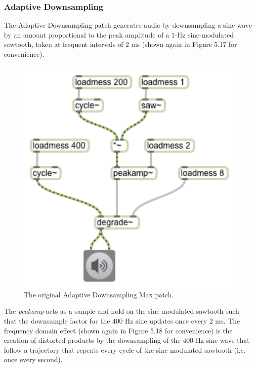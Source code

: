 \documentclass[a4paper,12pt]{report} 	%
\numberwithin{figure}{chapter}
\numberwithin{table}{chapter}
\numberwithin{equation}{chapter}
\begin{document}
\begin{flushleft}
\clearpage
\subsubsection{Adaptive Downsampling}
The Adaptive Downsampling patch generates audio by downsampling a sine wave by an amount proportional to the peak amplitude of a $1$-Hz sine-modulated sawtooth, taken at frequent intervals of $2$ ms (shown again in Figure 5.17 for convenience).
\begin{figure}[h!]
\begin{center}
\includegraphics[scale=0.8]{AdaptiveDegrade}
\caption[Original Adaptive Downsampling Max Patch]{The original Adaptive Downsampling Max patch.}
\end{center}
\end{figure}
The \emph{peakamp\texttildelow{}} acts as a sample-and-hold on the sine-modulated sawtooth such that the downsample factor for the $400$ Hz sine updates once every $2$ ms. The frequency domain effect (shown again in Figure 5.18 for convenience) is the creation of distorted products by the downsampling of the $400$-Hz sine wave that follow a trajectory that repeats every cycle of the sine-modulated sawtooth (i.e. once every second).
\begin{figure}[h!]
\begin{center}

\end{center}
\end{figure}
\end{flushleft}
\end{document}
